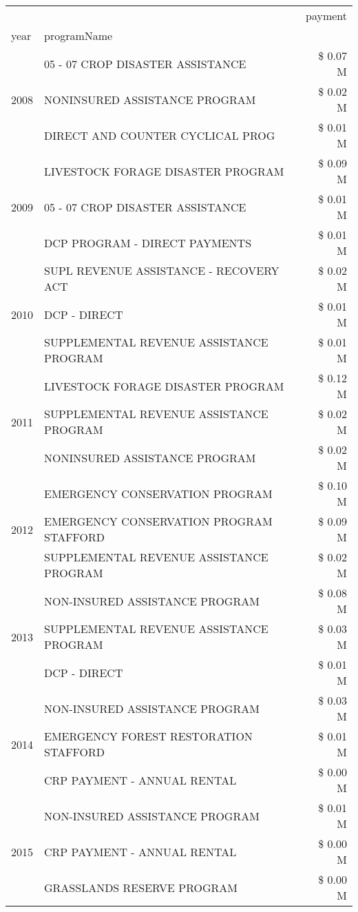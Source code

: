 \begin{tabular}{llr}
\toprule
 &  & payment \\
year & programName &  \\
\midrule
\multirow[t]{3}{*}{2008} & 05 - 07 CROP DISASTER ASSISTANCE & \$ 0.07 M \\
 & NONINSURED ASSISTANCE PROGRAM & \$ 0.02 M \\
 & DIRECT AND COUNTER CYCLICAL PROG & \$ 0.01 M \\
\cline{1-3}
\multirow[t]{3}{*}{2009} & LIVESTOCK FORAGE DISASTER  PROGRAM & \$ 0.09 M \\
 & 05 - 07 CROP DISASTER ASSISTANCE & \$ 0.01 M \\
 & DCP PROGRAM - DIRECT PAYMENTS & \$ 0.01 M \\
\cline{1-3}
\multirow[t]{3}{*}{2010} & SUPL REVENUE ASSISTANCE - RECOVERY ACT & \$ 0.02 M \\
 & DCP - DIRECT & \$ 0.01 M \\
 & SUPPLEMENTAL REVENUE ASSISTANCE PROGRAM & \$ 0.01 M \\
\cline{1-3}
\multirow[t]{3}{*}{2011} & LIVESTOCK FORAGE DISASTER PROGRAM & \$ 0.12 M \\
 & SUPPLEMENTAL REVENUE ASSISTANCE PROGRAM & \$ 0.02 M \\
 & NONINSURED ASSISTANCE PROGRAM & \$ 0.02 M \\
\cline{1-3}
\multirow[t]{3}{*}{2012} & EMERGENCY CONSERVATION PROGRAM & \$ 0.10 M \\
 & EMERGENCY CONSERVATION PROGRAM STAFFORD & \$ 0.09 M \\
 & SUPPLEMENTAL REVENUE ASSISTANCE PROGRAM & \$ 0.02 M \\
\cline{1-3}
\multirow[t]{3}{*}{2013} & NON-INSURED ASSISTANCE PROGRAM & \$ 0.08 M \\
 & SUPPLEMENTAL REVENUE ASSISTANCE PROGRAM & \$ 0.03 M \\
 & DCP - DIRECT & \$ 0.01 M \\
\cline{1-3}
\multirow[t]{3}{*}{2014} & NON-INSURED ASSISTANCE PROGRAM & \$ 0.03 M \\
 & EMERGENCY FOREST RESTORATION STAFFORD & \$ 0.01 M \\
 & CRP PAYMENT - ANNUAL RENTAL & \$ 0.00 M \\
\cline{1-3}
\multirow[t]{3}{*}{2015} & NON-INSURED ASSISTANCE PROGRAM & \$ 0.01 M \\
 & CRP PAYMENT - ANNUAL RENTAL & \$ 0.00 M \\
 & GRASSLANDS RESERVE PROGRAM & \$ 0.00 M \\

\end{tabular}
